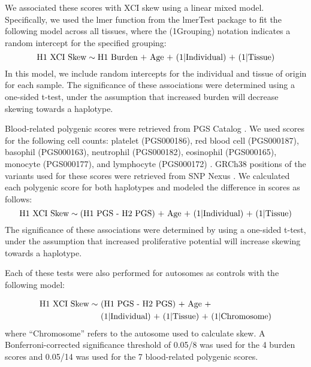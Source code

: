 We associated these scores with XCI skew using a linear mixed model. Specifically, we used the lmer function from the lmerTest package \cite{Kuznetsova2017-jp} to fit the following model across all tissues, where the (1\textbar Grouping) notation indicates a random intercept for the specified grouping:
\begin{equation}
\text{H1 XCI Skew} \sim \text{H1 Burden + Age + (1\textbar Individual) + (1\textbar Tissue)}
\end{equation}
In this model, we include random intercepts for the individual and tissue of origin for each sample. The significance of these associations were determined using a one-sided t-test, under the assumption that increased burden will decrease skewing towards a haplotype.

Blood-related polygenic scores were retrieved from PGS Catalog \cite{Lambert2021-iu}. We used scores for the following cell counts: platelet (PGS000186), red blood cell (PGS000187), basophil (PGS000163), neutrophil (PGS000182), eosinophil (PGS000165), monocyte (PGS000177), and lymphocyte (PGS000172) \cite{Vuckovic2020-gf}. GRCh38 positions of the variants used for these scores were retrieved from SNP Nexus \cite{Oscanoa2020-ac}. We calculated each polygenic score for both haplotypes and modeled the difference in scores as follows:
\begin{equation}
\text{H1 XCI Skew} \sim \text{(H1 PGS - H2 PGS) + Age + (1\textbar Individual) + (1\textbar Tissue)}
\end{equation}
The significance of these associations were determined by using a one-sided t-test, under the assumption that increased proliferative potential will increase skewing towards a haplotype. 

Each of these tests were also performed for autosomes as controls with the following model:

\begin{align}
\begin{split}
\text{H1 XCI Skew} \sim & \text{ (H1 PGS - H2 PGS) + Age +} \\
                        & \text{ (1\textbar Individual) + (1\textbar Tissue) + (1\textbar Chromosome)}
\end{split}
\end{align}
where “Chromosome” refers to the autosome used to calculate skew. A Bonferroni-corrected significance threshold of 0.05/8 was used for the 4 burden scores and 0.05/14 was used for the 7 blood-related polygenic scores. 

